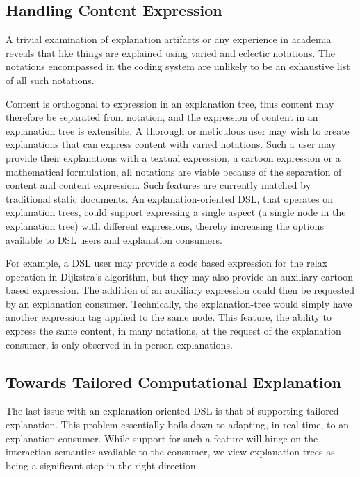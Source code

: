 \documentclass[sigconf]{acmart}
\begin{document}
\subsection{Handling Content Expression}
\label{sec:dis:expr}
A trivial examination of explanation artifacts or any experience in academia
reveals that like things are explained using varied and eclectic notations. The
notations encompassed in the coding system are unlikely to be an exhaustive list
of all such notations.

Content is orthogonal to expression in an explanation tree, thus content may
therefore be separated from notation, and the expression of content in an
explanation tree is extensible. A thorough or meticulous user may wish to create
explanations that can express content with varied notations. Such a user may
provide their explanations with a textual expression, a cartoon expression or a
mathematical formulation, all notations are viable because of the separation of
content and content expression. Such features are currently matched by
traditional static documents. An explanation-oriented DSL, that operates on
explanation trees, could support expressing a single aspect (a single node in
the explanation tree) with different expressions, thereby increasing the options
available to DSL users and explanation consumers.

For example, a DSL user may provide a code based expression for the relax
operation in Dijkstra's algorithm, but they may also provide an auxiliary
cartoon based expression. The addition of an auxiliary expression could then be
requested by an explanation consumer. Technically, the explanation-tree would
simply have another expression tag applied to the same node. This feature, the
ability to express the same content, in many notations, at the request of the
explanation consumer, is only observed in in-person explanations. 

\subsection{Towards Tailored Computational Explanation}
\label{sec:dis:tail}
The last issue with an explanation-oriented DSL is that of supporting tailored
explanation. This problem essentially boils down to adapting, in real time, to
an explanation consumer. While support for such a feature will hinge on the
interaction semantics available to the consumer, we view explanation trees as
being a significant step in the right direction.
\end{document}
